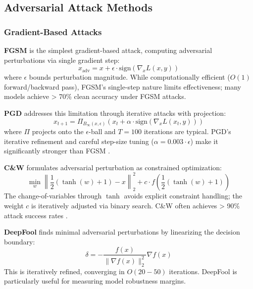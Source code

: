 \documentclass[10pt,conference]{IEEEtran}
\begin{document}
\subsection{Adversarial Attack Methods}

\subsubsection{Gradient-Based Attacks}

\textbf{FGSM} \cite{goodfellow2015explaining} is the simplest gradient-based attack, computing adversarial perturbations via single gradient step:
\begin{equation}
x_{\text{adv}} = x + \epsilon \cdot \text{sign}(\nabla_x L(x, y))
\end{equation}
where $\epsilon$ bounds perturbation magnitude. While computationally efficient ($O(1)$ forward/backward pass), FGSM's single-step nature limits effectiveness; many models achieve > 70\% clean accuracy under FGSM attacks.

\textbf{PGD} \cite{madry2018towards} addresses this limitation through iterative attacks with projection:
\begin{equation}
x_{t+1} = \Pi_{B_\infty(x,\epsilon)}(x_t + \alpha \cdot \text{sign}(\nabla_x L(x_t, y)))
\end{equation}
where $\Pi$ projects onto the $\epsilon$-ball and $T=100$ iterations are typical. PGD's iterative refinement and careful step-size tuning ($\alpha = 0.003 \cdot \epsilon$) make it significantly stronger than FGSM \cite{madry2018towards}.

\textbf{C\&W} \cite{carlini2017towards} formulates adversarial perturbation as constrained optimization:
\begin{equation}
\min_w \left\| \frac{1}{2}(\tanh(w)+1) - x \right\|_2^2 + c \cdot f\left(\frac{1}{2}(\tanh(w)+1)\right)
\end{equation}
The change-of-variables through $\tanh$ avoids explicit constraint handling; the weight $c$ is iteratively adjusted via binary search. C\&W often achieves > 90\% attack success rates \cite{carlini2017towards}.

\textbf{DeepFool} \cite{moosavi2016deepfool} finds minimal adversarial perturbations by linearizing the decision boundary:
\begin{equation}
\delta = -\frac{f(x)}{\|\nabla f(x)\|_2^2} \nabla f(x)
\end{equation}
This is iteratively refined, converging in $O(20-50)$ iterations. DeepFool is particularly useful for measuring model robustness margins.
\end{document}
